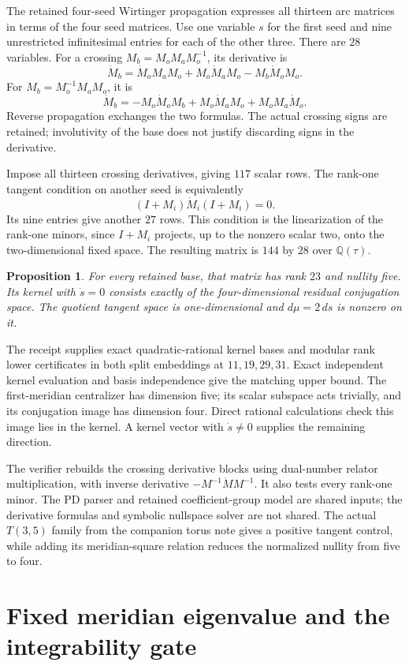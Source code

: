 \documentclass[11pt]{article}
\newtheorem{proposition}[theorem]{Proposition}
\begin{document}
The retained four-seed Wirtinger propagation expresses all thirteen
arc matrices in terms of the four seed matrices. Use one variable
$s$ for the first seed and nine unrestricted infinitesimal entries
for each of the other three. There are $28$ variables. For a
crossing $M_b=M_oM_aM_o^{-1}$, its derivative is
\[
 \dot M_b=\dot M_oM_aM_o+M_o\dot M_aM_o-M_b\dot M_oM_o.
\]
For $M_b=M_o^{-1}M_aM_o$, it is
\[
 \dot M_b=-M_o\dot M_oM_b+M_o\dot M_aM_o+M_oM_a\dot M_o.
\]
Reverse propagation exchanges the two formulas. The actual crossing
signs are retained; involutivity of the base does not justify
discarding signs in the derivative.

Impose all thirteen crossing derivatives, giving $117$ scalar rows.
The rank-one tangent condition on another seed is equivalently
\[
 (I+M_i)\dot M_i(I+M_i)=0.
\]
Its nine entries give another $27$ rows. This condition is the
linearization of the rank-one minors, since $I+M_i$ projects, up
to the nonzero scalar two, onto the two-dimensional fixed space.
The resulting matrix is $144$ by $28$ over $\mathbb Q(\tau)$.

\begin{proposition}\label{prop:tangent}
For every retained base, that matrix has rank $23$ and nullity five.
Its kernel with $\dot s=0$ consists exactly of the four-dimensional
residual conjugation space. The quotient tangent space is
one-dimensional and $d\mu=2\,ds$ is nonzero on it.
\end{proposition}
The receipt supplies exact quadratic-rational kernel bases and
modular rank lower certificates in both split embeddings at
$11,19,29,31$. Exact independent kernel evaluation and basis
independence give the matching upper bound. The first-meridian
centralizer has dimension five; its scalar subspace acts trivially,
and its conjugation image has dimension four. Direct rational
calculations check this image lies in the kernel. A kernel vector
with $\dot s\ne0$ supplies the remaining direction.

The verifier rebuilds the crossing derivative blocks using
dual-number relator multiplication, with inverse derivative
$-M^{-1}\dot M M^{-1}$. It also tests every rank-one minor.
The PD parser and retained coefficient-group model are shared inputs;
the derivative formulas and symbolic nullspace solver are not shared.
The actual $T(3,5)$ family from the companion torus note gives a
positive tangent control, while adding its meridian-square relation
reduces the normalized nullity from five to four.

\section{Fixed meridian eigenvalue and the integrability gate}
\end{document}
